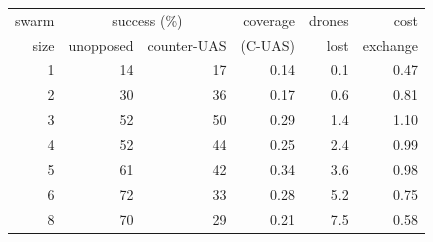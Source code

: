 \begin{tabular}{rrrrrr}
\toprule
swarm & \multicolumn{2}{c}{success (\%)} & coverage & drones & cost \\
size & unopposed & counter-UAS & (C-UAS) & lost & exchange \\
\midrule
1 & 14 & 17 & 0.14 & 0.1 & 0.47 \\
2 & 30 & 36 & 0.17 & 0.6 & 0.81 \\
3 & 52 & 50 & 0.29 & 1.4 & 1.10 \\
4 & 52 & 44 & 0.25 & 2.4 & 0.99 \\
5 & 61 & 42 & 0.34 & 3.6 & 0.98 \\
6 & 72 & 33 & 0.28 & 5.2 & 0.75 \\
8 & 70 & 29 & 0.21 & 7.5 & 0.58 \\
\bottomrule
\end{tabular}
